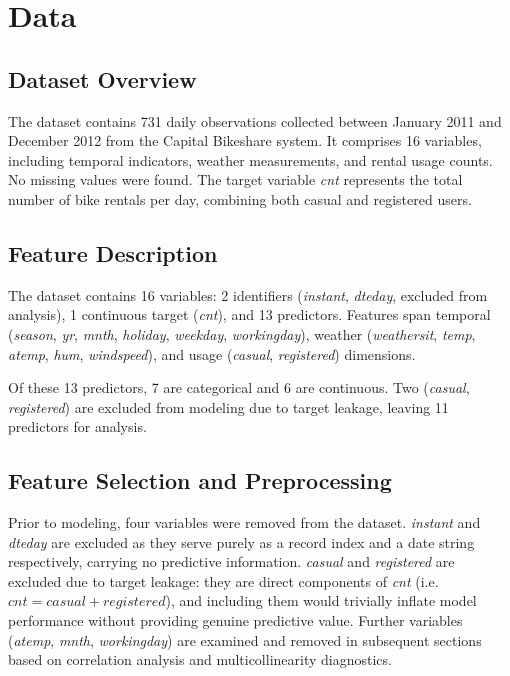 \documentclass[12pt, a4paper]{article}
\begin{document}
\section{Data}

\subsection{Dataset Overview}
The dataset contains 731 daily observations collected between January 2011 and
December 2012 from the Capital Bikeshare system. It comprises 16 variables,
including temporal indicators, weather measurements, and rental usage counts.
No missing values were found. The target variable \textit{cnt} represents the
total number of bike rentals per day, combining both casual and registered users.

\subsection{Feature Description}
The dataset contains 16 variables: 2 identifiers (\textit{instant}, \textit{dteday},
excluded from analysis), 1 continuous target (\textit{cnt}), and 13 predictors.
Features span temporal (\textit{season}, \textit{yr}, \textit{mnth}, \textit{holiday},
\textit{weekday}, \textit{workingday}), weather (\textit{weathersit}, \textit{temp},
\textit{atemp}, \textit{hum}, \textit{windspeed}), and usage (\textit{casual},
\textit{registered}) dimensions. 

Of these 13 predictors, 7 are categorical and 6 are continuous.
Two (\textit{casual}, \textit{registered}) are excluded from modeling
due to target leakage, leaving 11 predictors for analysis.

\subsection{Feature Selection and Preprocessing}
Prior to modeling, four variables were removed from the dataset.
\textit{instant} and \textit{dteday} are excluded as they serve purely as
a record index and a date string respectively, carrying no predictive
information. \textit{casual} and \textit{registered} are excluded due to
target leakage: they are direct components of \textit{cnt} (i.e.\
$\textit{cnt} = \textit{casual} + \textit{registered}$), and including them
would trivially inflate model performance without providing genuine
predictive value. Further variables (\textit{atemp}, \textit{mnth},
\textit{workingday}) are examined and removed in subsequent sections based
on correlation analysis and multicollinearity diagnostics.
\end{document}

